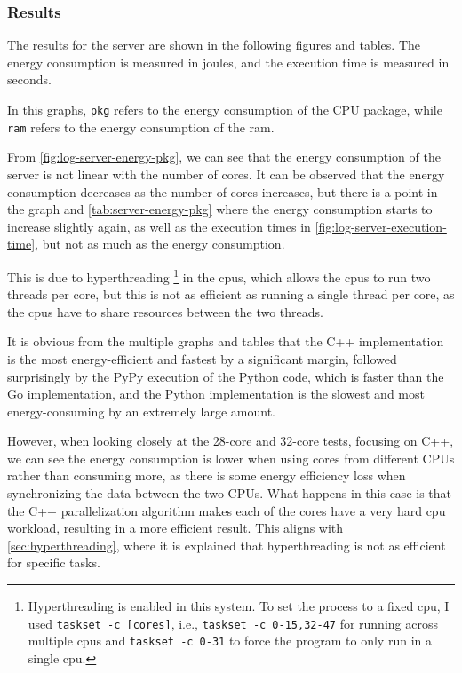 \subsubsection{Results}

\newlength{\plotwidthgraph}
\newlength{\plotheightgraph}
\setlength{\plotwidthgraph}{14cm}
\setlength{\plotheightgraph}{8cm}

The results for the server are shown in the following figures and tables. The energy consumption is measured in joules, and the execution time is measured in seconds. 

In this graphs, \texttt{pkg} refers to the energy consumption of the CPU package, while \texttt{ram} refers to the energy consumption of the \gls{ram}.







From \autoref{fig:log-server-energy-pkg}, we can see that the energy consumption of the server is not linear with the number of cores. It can be observed that the energy consumption decreases as the number of cores increases, but there is a point in the graph and \autoref{tab:server-energy-pkg} where the energy consumption starts to increase slightly again, as well as the execution times in \autoref{fig:log-server-execution-time}, but not as much as the energy consumption.

This is due to hyperthreading \footnote{Hyperthreading is enabled in this system. To set the process to a fixed \gls{cpu}, I used \texttt{taskset -c [cores]}, i.e., \texttt{taskset -c 0-15,32-47} for running across multiple \glspl{cpu} and \texttt{taskset -c 0-31} to force the program to only run in a single \gls{cpu}.} in the \glspl{cpu}, which allows the \glspl{cpu} to run two threads per core, but this is not as efficient as running a single thread per core, as the \glspl{cpu} have to share resources between the two threads.

It is obvious from the multiple graphs and tables that the C++ implementation is the most energy-efficient and fastest by a significant margin, followed surprisingly by the PyPy execution of the Python code, which is faster than the Go implementation, and the Python implementation is the slowest and most energy-consuming by an extremely large amount.

However, when looking closely at the 28-core and 32-core tests, focusing on C++, we can see the energy consumption is lower when using cores from different CPUs rather than consuming more, as there is some energy efficiency loss when synchronizing the data between the two CPUs. What happens in this case is that the C++ parallelization algorithm makes each of the cores have a very hard \gls{cpu} workload, resulting in a more efficient result. This aligns with \autoref{sec:hyperthreading}, where it is explained that hyperthreading is not as efficient for specific tasks.

